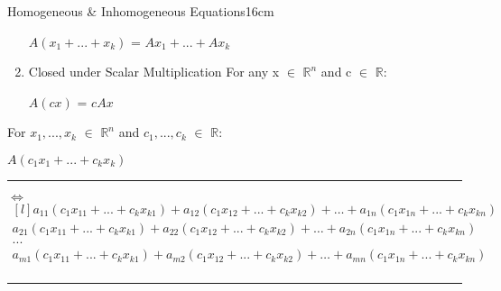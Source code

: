 \begin{definition}{Homogeneous \& Inhomogeneous Equations}{16cm}
\begin{enumerate}[label=(\alph*), leftmargin=1cm, itemsep=0.1cm]
                \hspace{0.5cm}
                $A(x_1+...+x_k)$ = $Ax_1 + ... + Ax_k$

            \item {\color{lgreen} Closed under Scalar Multiplication}
                For any x $\in$ $\mathbb{R}^n$ and c $\in$ $\mathbb{R}$:

                \hspace{0.5cm}
                $A(cx)$ = $c Ax$
        \end{enumerate}

        \begin{boxedminipage}{16cm}
            For $x_1,...,x_k$ $\in$ $\mathbb{R}^n$
            and $c_1,...,c_k$ $\in$ $\mathbb{R}$:
    
            \hspace{0.5cm}
            $A(c_1x_1+...+c_kx_k)$
    
            \hspace{0.5cm}
            \rule[0.1cm]{15.1cm}{0.01cm}
    
            \hspace{0.5cm}
            $\Leftrightarrow$
            $\begin{matrix*}[l]
                a_{11}(c_1x_{11}+...+c_kx_{k1})
                    + a_{12}(c_1x_{12}+...+c_kx_{k2})
                    + \hdots + a_{1n}(c_1x_{1n}+...+c_kx_{kn}) \\
                a_{21}(c_1x_{11}+...+c_kx_{k1})
                    + a_{22}(c_1x_{12}+...+c_kx_{k2})
                    + \hdots + a_{2n}(c_1x_{1n}+...+c_kx_{kn}) \\
                ... \\
                a_{m1}(c_1x_{11}+...+c_kx_{k1})
                    + a_{m2}(c_1x_{12}+...+c_kx_{k2})
                    + \hdots + a_{mn}(c_1x_{1n}+...+c_kx_{kn}) \\
            \end{matrix*}$
    
            \hspace{0.5cm}
            \rule[0.1cm]{15.1cm}{0.01cm}
    

\end{boxedminipage}
\end{definition}
